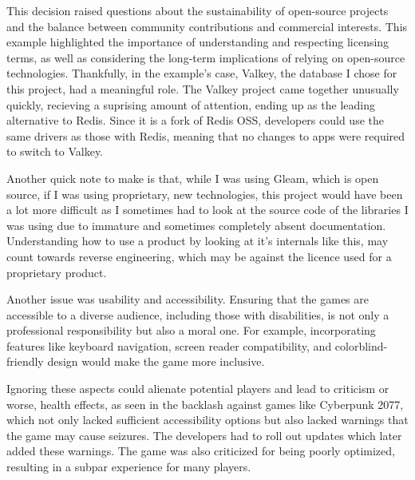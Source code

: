 \documentclass[]{final}
\begin{document}

This decision raised questions about the sustainability of open-source projects
and the balance between community contributions and commercial interests.
This example highlighted the importance of understanding
and respecting licensing terms, as well as considering the long-term
implications of relying on open-source technologies. Thankfully, in the example's
case, Valkey, the database I chose for this project, had a meaningful role.
The Valkey project came together unusually quickly, recieving a suprising amount
of attention, ending up as the leading alternative to Redis. Since it is a fork
of Redis OSS, developers could use the same drivers as those with Redis, meaning
that no changes to apps were required to switch to Valkey.


Another quick note to make is that, while I was using Gleam, which is open source,
if I was using proprietary, new technologies, this project would have been a lot
more difficult as I sometimes had to look at the source code of the libraries I was using
due to immature and sometimes completely absent documentation. Understanding how
to use a product by looking at it's internals like this, may count towards
reverse engineering, which may be against the licence used for a proprietary
product.

Another issue was usability and accessibility.
Ensuring that the games are accessible to a diverse
audience, including those with disabilities, is not only a professional
responsibility but also a moral one. For example, incorporating features like
keyboard navigation, screen reader compatibility, and colorblind-friendly
design would make the game more inclusive.

Ignoring these aspects could
alienate potential players and lead to criticism or worse, health effects, as
seen in the backlash against games like Cyberpunk 2077, which not only lacked
sufficient accessibility options but also lacked warnings that the game
may cause seizures. The developers had to roll out updates which later added
these warnings.%
The game was also criticized for being poorly optimized,
resulting in a subpar experience for many players.
\end{document}
